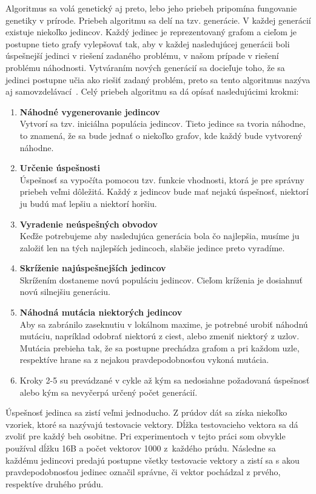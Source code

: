 Algoritmus sa volá genetický aj preto, lebo jeho priebeh pripomína fungovanie genetiky v prírode. Priebeh algoritmu sa delí na tzv. generácie. V každej generácií existuje niekoľko jedincov. Každý jedinec je reprezentovaný grafom a cieľom je postupne tieto grafy vylepšovať tak, aby v každej nasledujúcej generácii boli úspešnejší jedinci v riešení zadaného problému, v našom prípade v riešení problému náhodnosti. Vytváraním nových generácií sa docieľuje toho, že sa jedinci postupne učia ako riešiť zadaný problém, preto sa tento algoritmus nazýva aj samovzdelávací~\cite{machine_learning}. Celý priebeh algoritmu sa dá opísať nasledujúcimi krokmi:\vspace{-10pt}
\begin{enumerate}
	\item \textbf{Náhodné vygenerovanie jedincov}\\Vytvorí sa tzv. iniciálna populácia jedincov. Tieto jedince sa tvoria náhodne, to znamená, že sa bude jednať o niekoľko grafov, kde každý bude vytvorený náhodne.
	\item \textbf{Určenie úspešnosti}\\Úspešnosť sa vypočíta pomocou tzv. funkcie vhodnosti, ktorá je pre správny priebeh veľmi dôležitá. Každý z jedincov bude mať nejakú úspešnosť, niektorí ju budú mať lepšiu a niektorí horšiu.
	\item \textbf{Vyradenie neúspešných obvodov}\\Keďže potrebujeme aby nasledujúca generácia bola čo najlepšia, musíme ju založiť len na tých najlepších jedincoch, slabšie jedince preto vyradíme.
	\item \textbf{Skríženie najúspešnejších jedincov}\\Skrížením dostaneme novú populáciu jedincov. Cieľom kríženia je dosiahnuť novú silnejšiu generáciu.
	\item \textbf{Náhodná mutácia niektorých jedincov}\\Aby sa zabránilo zaseknutiu v lokálnom maxime, je potrebné urobiť náhodnú mutáciu, napríklad odobrať niektorú z ciest, alebo zmeniť niektorý z uzlov. Mutácia prebieha tak, že sa postupne prechádza grafom a pri každom uzle, respektíve hrane sa z nejakou pravdepodobnosťou vykoná mutácia.
	\item Kroky 2-5 su prevádzané v cykle až kým sa nedosiahne požadovaná úspešnosť alebo kým sa nevyčerpá určený počet generácií.
\end{enumerate}
Úspešnosť jedinca sa zistí veľmi jednoducho. Z prúdov dát sa získa niekoľko vzoriek, ktoré sa nazývajú testovacie vektory. Dĺžka testovacieho vektora sa dá zvoliť pre každý beh osobitne. Pri experimentoch v tejto práci som obvykle používal dĺžku 16B a počet vektorov 1000 z~každého prúdu. Následne sa každému jedincovi predajú postupne všetky testovacie vektory a zistí sa s akou pravdepodobnosťou jedinec označil správne, či vektor pochádzal z prvého, respektíve druhého prúdu. 

